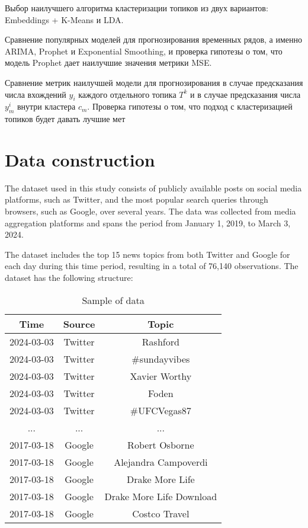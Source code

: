Выбор наилучшего алгоритма кластеризации топиков из двух вариантов: Embeddings + K-Means и LDA.

Сравнение популярных моделей для прогнозирования временных рядов, а именно ARIMA, Prophet и Exponential Smoothing, и проверка гипотезы о том, что модель Prophet дает наилучшие значения метрики MSE.

Сравнение метрик наилучшей модели для прогнозирования в случае предсказания числа вхождений $y_i$ каждого отдельного топика $T^k$ и в случае предсказания числа $y_m^i$ внутри кластера $c_m$. Проверка гипотезы о том, что подход с кластеризацией топиков будет давать лучшие мет









\section{Data construction}
\label{sec:headings}
The dataset used in this study consists of publicly available posts on social media platforms, such as Twitter, and the most popular search queries through browsers, such as Google, over several years. The data was collected from media aggregation platforms and spans the period from January 1, 2019, to March 3, 2024.

The dataset includes the top 15 news topics from both Twitter and Google for each day during this time period, resulting in a total of 76,140 observations. The dataset has the following structure:

\begin{table}[h]
\centering
\begin{tabular}{|c|c|c|}
\hline
\textbf{Time} & \textbf{Source} & \textbf{Topic}           \\ \hline
2024-03-03    & Twitter         & Rashford                 \\ \hline
2024-03-03    & Twitter         & \#sundayvibes            \\ \hline
2024-03-03    & Twitter         & Xavier Worthy            \\ \hline
2024-03-03    & Twitter         & Foden                    \\ \hline
2024-03-03    & Twitter         & \#UFCVegas87             \\ \hline
...           & ...             & ...                      \\ \hline
2017-03-18    & Google          & Robert Osborne           \\ \hline
2017-03-18    & Google          & Alejandra Campoverdi     \\ \hline
2017-03-18    & Google          & Drake More Life          \\ \hline
2017-03-18    & Google          & Drake More Life Download \\ \hline
2017-03-18    & Google          & Costco Travel            \\ \hline
\end{tabular}
\caption{Sample of data}
\label{tab:timefromtime}
\end{table}

